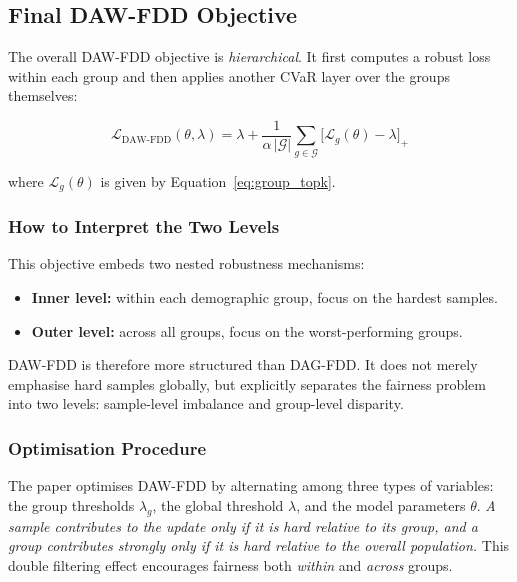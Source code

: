 \subsection{Final DAW-FDD Objective}
\label{sec:daw_objective}

The overall DAW-FDD objective is \emph{hierarchical}. It first computes a robust loss within each group and then applies another CVaR layer over the groups themselves:

\begin{equation}
    \mathcal{L}_{\mathrm{DAW\text{-}FDD}}(\theta,\lambda)
    = \lambda
      + \frac{1}{\alpha\,|\mathcal{G}|}
        \sum_{g \in \mathcal{G}}
        \bigl[\mathcal{L}_g(\theta) - \lambda\bigr]_{+}
    \label{eq:daw_obj}
\end{equation}

\noindent where $\mathcal{L}_g(\theta)$ is given by Equation~\eqref{eq:group_topk}.

\subsubsection{How to Interpret the Two Levels}
\label{subsec:daw_two_levels}

This objective embeds two nested robustness mechanisms:

\begin{itemize}
    \item \textbf{Inner level:} within each demographic group, focus on the hardest samples.
    \item \textbf{Outer level:} across all groups, focus on the worst-performing groups.
\end{itemize}

\noindent DAW-FDD is therefore more structured than DAG-FDD. It does not merely emphasise hard samples globally, but explicitly separates the fairness problem into two levels: sample-level imbalance and group-level disparity.

\subsubsection{Optimisation Procedure}
\label{subsec:daw_optim}

The paper optimises DAW-FDD by alternating among three types of variables: the group thresholds $\lambda_g$, the global threshold $\lambda$, and the model parameters $\theta$. \emph{A sample contributes to the update only if it is hard relative to its group, and a group contributes strongly only if it is hard relative to the overall population.} This double filtering effect encourages fairness both \emph{within} and \emph{across} groups.

